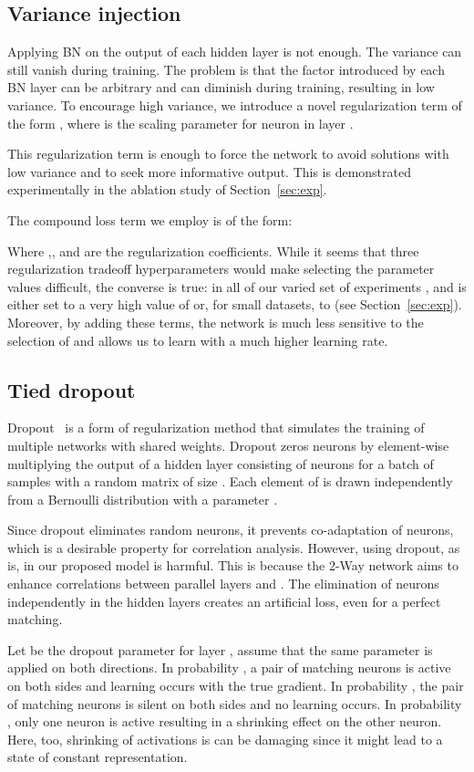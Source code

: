 \documentclass[10pt,twocolumn,letterpaper]{article}
\begin{document}
\subsection{Variance injection}
Applying BN on the output of each hidden layer is not enough. The variance can still vanish during training. The problem is that the  factor introduced by each BN layer can be arbitrary and can diminish during training, resulting in low variance. To encourage high variance, we introduce a novel regularization term of the form , where  is the scaling parameter for neuron  in layer .

This regularization term is enough to force the network to avoid solutions with low variance and to seek more informative output. This is demonstrated experimentally in the ablation study of Section~\ref{sec:exp}.

The compound loss term we employ is of the form:

Where ,, and  are the regularization coefficients. While it seems that three regularization tradeoff hyperparameters would make selecting the parameter values difficult, the converse is true: in all of our varied set of experiments , and  is either set to a very high value of  or, for small datasets, to  (see Section~\ref{sec:exp}). Moreover, by adding these terms, the network is much less sensitive to the selection of  and allows us to learn with a much higher learning rate.

\subsection{Tied dropout}\label{sec:drop}
Dropout~\cite{dropout} is a form of regularization method that simulates the training of multiple networks with shared weights. Dropout zeros neurons by element-wise multiplying the output of a hidden layer consisting of  neurons for a batch of  samples with a random matrix  of size . Each element of  is drawn independently from a Bernoulli distribution with a parameter .

Since dropout eliminates random neurons, it prevents co-adaptation of neurons, which is a desirable property for correlation analysis. However, using dropout, as is, in our proposed model is harmful. This is because the 2-Way network aims to enhance correlations between parallel layers  and . The elimination of neurons independently in the hidden layers creates an artificial loss, even for a perfect matching. 

Let  be the dropout parameter for layer , assume that the same parameter is applied on both directions. In probability , a pair of matching neurons is active on both sides and learning occurs with the true gradient. In probability , the pair of matching neurons is silent on both sides and no learning occurs. In probability , only one neuron is active resulting in a shrinking effect on the other neuron. Here, too, shrinking of activations is can be damaging since it might lead to a state of constant representation.
\end{document}
